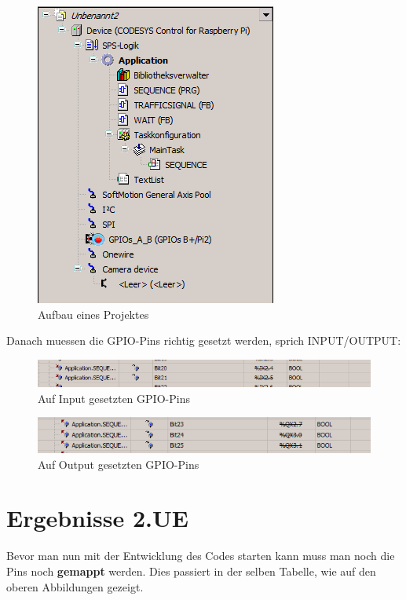 \begin{figure}[!h]
	\begin{center}
		\includegraphics[width=0.5\linewidth]{images/projektstruktur}
		\caption{Aufbau eines Projektes}
		\label{aufbauprojekt}
	\end{center}
\end{figure}
\newpage
Danach muessen die GPIO-Pins richtig gesetzt werden, sprich INPUT/OUTPUT:
\begin{figure}[!h]
	\begin{center}
		\includegraphics[width=0.8\linewidth]{images/input}
		\caption{Auf Input gesetzten GPIO-Pins}
		\label{aufbauprojekt}
	\end{center}
\end{figure}

\begin{figure}[!h]
	\begin{center}
		\includegraphics[width=0.8\linewidth]{images/output}
		\caption{Auf Output gesetzten GPIO-Pins}
		\label{aufbauprojekt}
	\end{center}
\end{figure}

\section{Ergebnisse 2.UE}
Bevor man nun mit der Entwicklung des Codes starten kann muss man noch die Pins noch \textbf{gemappt} werden. Dies passiert in der selben Tabelle, wie auf den oberen Abbildungen gezeigt.

